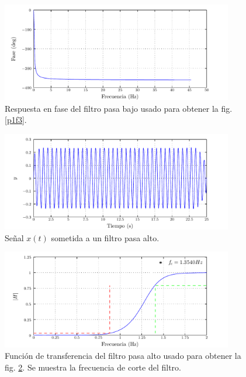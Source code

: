\documentclass[a4paper,12pt,final]{article}
\begin{document}
      \begin{figure}[H]
        \begin{center}
          \caption{Respuesta en fase del filtro pasa bajo usado para obtener la fig. \ref{p1f3}.}
          \label{p1f6}
          \vspace{-1em}
          \includegraphics[width=0.9\textwidth]{./laboratorio_5/problema01_lowpass_filter_phase.pdf}
        \end{center}
      \end{figure}

      \begin{figure}[H]
        \begin{center}
          \caption{Señal $x\left(t\right)$ sometida a un filtro pasa alto.}
          \label{p1f7}
          \vspace{-1em}
          \includegraphics[width=0.9\textwidth]{./laboratorio_5/problema01_highpass_filtered_signal.pdf}
        \end{center}
      \end{figure}

      \begin{figure}[H]
        \begin{center}
          \caption{Función de transferencia del filtro pasa alto usado para obtener la fig. \ref{p1f7}. Se muestra la frecuencia de corte del filtro.}
          \label{p1f8}
          \vspace{-1em}
          \includegraphics[width=0.9\textwidth]{./laboratorio_5/problema01_highpass_transfer_function.pdf}
        \end{center}
      \end{figure}
\end{document}
